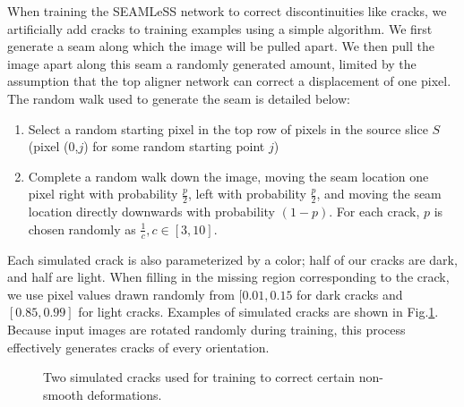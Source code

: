 \documentclass{article}
\begin{document}
When training the SEAMLeSS network to correct discontinuities like cracks, we artificially add cracks to training examples using a simple algorithm. We first generate a seam along which the image will be pulled apart. We then pull the image apart along this seam a randomly generated amount, limited by the assumption that the top aligner network can correct a displacement of one pixel. The random walk used to generate the seam is detailed below:
\begin{enumerate}
    \item Select a random starting pixel in the top row of pixels in the source slice $S$ (pixel (0,$j$) for some random starting point $j$)
    \item Complete a random walk down the image, moving the seam location one pixel right with probability $\frac{p}{2}$, left with probability $\frac{p}{2}$, and moving the seam location directly downwards with probability $(1-p)$. For each crack, $p$ is chosen randomly as $\frac{1}{c}, c\in [3,10]$.
\end{enumerate}

Each simulated crack is also parameterized by a color; half of our cracks are dark, and half are light. When filling in the missing region corresponding to the crack, we use pixel values drawn randomly from $[0.01,0.15$ for dark cracks and $[0.85,0.99]$ for light cracks. Examples of simulated cracks are shown in Fig.\ref{simulatedcracks}. Because input images are rotated randomly during training, this process effectively generates cracks of every orientation.

\begin{figure}[htp]
    \centering
    \caption{Two simulated cracks used for training to correct certain non-smooth deformations.}
    \label{simulatedcracks}
\end{figure}
\end{document}
